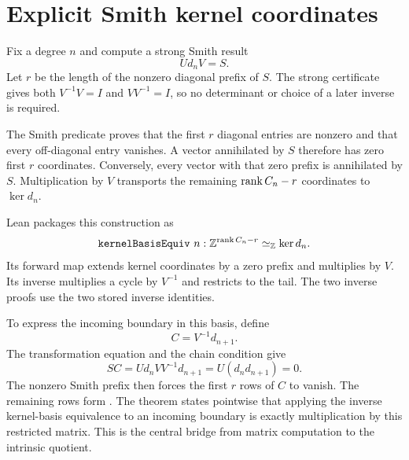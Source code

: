\section{Explicit Smith kernel coordinates}

Fix a degree $n$ and compute a strong Smith result
\[
  Ud_nV=S.
\]
Let $r$ be the length of the nonzero diagonal prefix of $S$.  The strong
certificate gives both $V^{-1}V=I$ and $VV^{-1}=I$, so no determinant or
choice of a later inverse is required.

The Smith predicate proves that the first $r$ diagonal entries are nonzero
and that every off-diagonal entry vanishes.  A vector annihilated by $S$
therefore has zero first $r$ coordinates.  Conversely, every vector with
that zero prefix is annihilated by $S$.  Multiplication by $V$ transports
the remaining $\operatorname{rank} C_n-r$ coordinates to $\ker d_n$.

Lean packages this construction as
\[
  \texttt{kernelBasisEquiv}\ n :
  \mathbb{Z}^{\operatorname{rank} C_n-r}\simeq_{\mathbb{Z}}\ker d_n.
\]
Its forward map extends kernel coordinates by a zero prefix and multiplies
by $V$.  Its inverse multiplies a cycle by $V^{-1}$ and restricts to the
tail.  The two inverse proofs use the two stored inverse identities.

To express the incoming boundary in this basis, define
\[
  C=V^{-1}d_{n+1}.
\]
The transformation equation and the chain condition give
\[
  SC
  =Ud_nVV^{-1}d_{n+1}
  =U(d_nd_{n+1})=0.
\]
The nonzero Smith prefix then forces the first $r$ rows of $C$ to vanish.
The remaining rows form .  The theorem
 states pointwise that applying the
inverse kernel-basis equivalence to an incoming boundary is exactly
multiplication by this restricted matrix.  This is the central bridge from
matrix computation to the intrinsic quotient.
